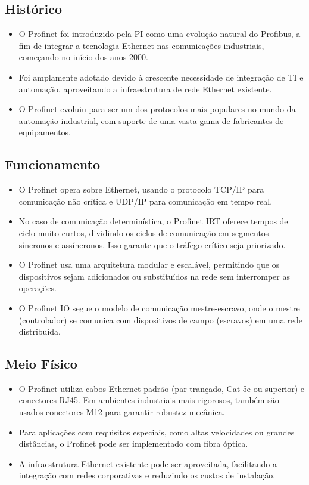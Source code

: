 \documentclass[a4paper,11pt]{article} %
\begin{document}
\subsection{Histórico}
\begin{itemize}
    \item O Profinet foi introduzido pela PI como uma evolução natural do Profibus, a fim de integrar a tecnologia Ethernet nas comunicações industriais, começando no início dos anos 2000.
    \item Foi amplamente adotado devido à crescente necessidade de integração de TI e automação, aproveitando a infraestrutura de rede Ethernet existente.
    \item O Profinet evoluiu para ser um dos protocolos mais populares no mundo da automação industrial, com suporte de uma vasta gama de fabricantes de equipamentos.
\end{itemize}

\subsection{Funcionamento}
\begin{itemize}
    \item O Profinet opera sobre Ethernet, usando o protocolo TCP/IP para comunicação não crítica e UDP/IP para comunicação em tempo real.
    \item No caso de comunicação determinística, o Profinet IRT oferece tempos de ciclo muito curtos, dividindo os ciclos de comunicação em segmentos síncronos e assíncronos. Isso garante que o tráfego crítico seja priorizado.
    \item O Profinet usa uma arquitetura modular e escalável, permitindo que os dispositivos sejam adicionados ou substituídos na rede sem interromper as operações.
    \item O Profinet IO segue o modelo de comunicação mestre-escravo, onde o mestre (controlador) se comunica com dispositivos de campo (escravos) em uma rede distribuída.
\end{itemize}

\subsection{Meio Físico}
\begin{itemize}
    \item O Profinet utiliza cabos Ethernet padrão (par trançado, Cat 5e ou superior) e conectores RJ45. Em ambientes industriais mais rigorosos, também são usados conectores M12 para garantir robustez mecânica.
    \item Para aplicações com requisitos especiais, como altas velocidades ou grandes distâncias, o Profinet pode ser implementado com fibra óptica.
    \item A infraestrutura Ethernet existente pode ser aproveitada, facilitando a integração com redes corporativas e reduzindo os custos de instalação.
\end{itemize}
\end{document}
